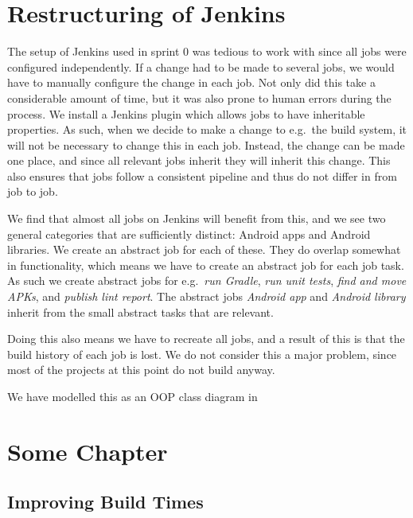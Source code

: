 



\chapter{Restructuring of Jenkins}
The setup of Jenkins used in sprint 0 was tedious to work with since all jobs were configured independently. If a change had to be made to several jobs, we would have to manually configure the change in each job. Not only did this take a considerable amount of time, but it was also prone to human errors during the process. We install a Jenkins plugin which allows jobs to have inheritable properties. As such, when we decide to make a change to e.g.\ the build system, it will not be necessary to change this in each job. Instead, the change can be made one place, and since all relevant jobs inherit they will inherit this change. This also ensures that jobs follow a consistent pipeline and thus do not differ in from job to job.

We find that almost all jobs on Jenkins will benefit from this, and we see two general categories that are sufficiently distinct: Android apps and Android libraries. We create an abstract job for each of these. They do overlap somewhat in functionality, which means we have to create an abstract job for each job task. As such we create abstract jobs for e.g.\ \emph{run Gradle}, \emph{run unit tests}, \emph{find and move APKs}, and \emph{publish lint report}. The abstract jobs \emph{Android app} and \emph{Android library} inherit from the small abstract tasks that are relevant.

Doing this also means we have to recreate all jobs, and a result of this is that the build history of each job is lost. We do not consider this a major problem, since most of the projects at this point do not build anyway.

We have modelled this as an OOP class diagram in 


\chapter{Some Chapter}
\section{Improving Build Times}

